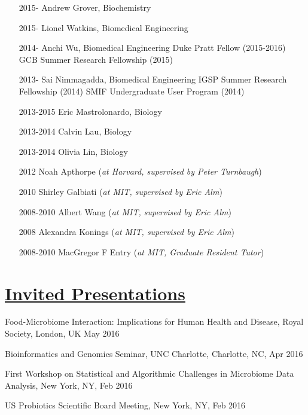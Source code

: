 \documentclass[overlapped,line,11pt]{res}
\begin{document}
\begin{resume}
\begin{itemize}[leftmargin=2cm, style=sameline, itemsep=0mm]
\item[2015-] Andrew Grover, Biochemistry 
\item[2015-] Lionel Watkins, Biomedical Engineering 
\item[2014-] Anchi Wu, Biomedical Engineering \newline 
  Duke Pratt Fellow (2015-2016)
  GCB Summer Research Fellowship (2015)
\item[2013-] Sai Nimmagadda, Biomedical Engineering \newline
  IGSP Summer Research Fellowship (2014) \newline
  SMIF Undergraduate User Program (2014)
\item[2013-2015] Eric Mastrolonardo, 
  Biology 
\item[2013-2014] Calvin Lau, Biology 
\item[2013-2014] Olivia Lin, Biology
\item[2012] Noah Apthorpe (\emph{at Harvard, supervised by Peter Turnbaugh})
\item[2010] Shirley Galbiati (\emph{at MIT, supervised by Eric Alm})
\item[2008-2010] Albert Wang (\emph{at MIT, supervised by Eric Alm})
\item[2008] Alexandra Konings (\emph{at MIT, supervised by Eric Alm})
\item[2008-2010] MacGregor F Entry (\emph{at MIT, Graduate Resident Tutor})
\end{itemize}

\section{\underline{\sc Invited Presentations}}
\vspace{.25in}

\begin{revnumerate}[44]

\item {Food-Microbiome Interaction: Implications for Human Health and Disease, Royal Society, London, UK May 2016}

\item {Bioinformatics and Genomics Seminar, UNC Charlotte, Charlotte, NC, Apr 2016}

\item {First Workshop on Statistical and Algorithmic Challenges in Microbiome Data Analysis, New York, NY, Feb 2016}

\item {US Probiotics Scientific Board Meeting, New York, NY, Feb 2016}


\end{revnumerate}
\end{resume}
\end{document}
